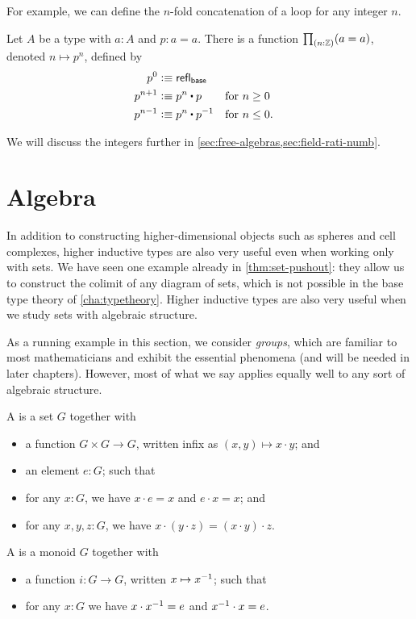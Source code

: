 For example, we can define the $n$-fold concatenation of a loop for any integer $n$.

\begin{cor}\label{thm:looptothe}
  Let $A$ be a type with $a:A$ and $p:a=a$.
  There is a function $\prd{n:\Z} (a=a)$, denoted $n\mapsto p^n$, defined by
  \begin{align*}
    p^0 &\defeq \refl{\base}\\
    p^{n+1} &\defeq p^n \ct p
    & &\text{for $n\ge 0$}\\
    p^{n-1} &\defeq p^n \ct \opp p
    & &\text{for $n\le 0$.}
  \end{align*}
\end{cor}

We will discuss the integers further in \autoref{sec:free-algebras,sec:field-rati-numb}.


\section{Algebra}
\label{sec:free-algebras}

In addition to constructing higher-dimensional objects such as spheres and cell complexes, higher inductive types are also very useful even when working only with sets.
We have seen one example already in \autoref{thm:set-pushout}: they allow us to construct the colimit of any diagram of sets, which is not possible in the base type theory of \autoref{cha:typetheory}.
Higher inductive types are also very useful when we study sets with algebraic structure.

As a running example in this section, we consider \emph{groups}, which are familiar to most mathematicians and exhibit the essential phenomena (and will be needed in later chapters).
However, most of what we say applies equally well to any sort of algebraic structure.

\begin{defn}
  A 
  is a set $G$ together with
  \begin{itemize}
  \item a function $G\times G\to G$, written infix as $(x,y) \mapsto x\cdot y$; and
  \item an element $e:G$; such that
  \item for any $x:G$, we have $x\cdot e = x$ and $e\cdot x = x$; and
  \item for any $x,y,z:G$, we have $x\cdot (y\cdot z) = (x\cdot y)\cdot z$.
  \end{itemize}
  A 
  is a monoid $G$ together with
  \begin{itemize}
  \item a function $i:G\to G$, written $x\mapsto \mathord{{x}^{-1}}$; such that
  \item for any $x:G$ we have $x\cdot \mathord{{x}^{-1}} = e$ and $\mathord{{x}^{-1}} \cdot x = e$.
  \end{itemize}
\end{defn}

